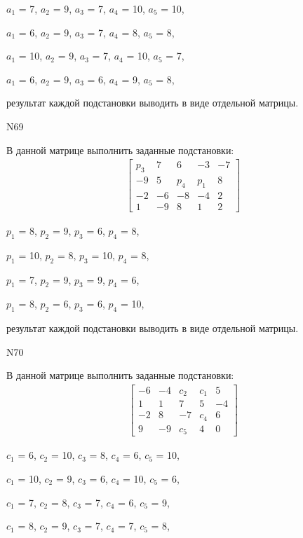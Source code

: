 \documentclass[11pt]{report}
\begin{document}
$a_{1}$ = 7, $a_{2}$ = 9, $a_{3}$ = 7, $a_{4}$ = 10, $a_{5}$ = 10, 

$a_{1}$ = 6, $a_{2}$ = 9, $a_{3}$ = 7, $a_{4}$ = 8, $a_{5}$ = 8, 

$a_{1}$ = 10, $a_{2}$ = 9, $a_{3}$ = 7, $a_{4}$ = 10, $a_{5}$ = 7, 

$a_{1}$ = 6, $a_{2}$ = 9, $a_{3}$ = 6, $a_{4}$ = 9, $a_{5}$ = 8, 

результат каждой подстановки выводить в виде отдельной матрицы.

N69

В данной матрице выполнить заданные подстановки:
\begin{align*}
\left[\begin{matrix}p_{3} & 7 & 6 & -3 & -7\\-9 & 5 & p_{4} & p_{1} & 8\\-2 & -6 & -8 & -4 & 2\\1 & -9 & 8 & 1 & 2\end{matrix}\right]
\end{align*}


$p_{1}$ = 8, $p_{2}$ = 9, $p_{3}$ = 6, $p_{4}$ = 8, 

$p_{1}$ = 10, $p_{2}$ = 8, $p_{3}$ = 10, $p_{4}$ = 8, 

$p_{1}$ = 7, $p_{2}$ = 9, $p_{3}$ = 9, $p_{4}$ = 6, 

$p_{1}$ = 8, $p_{2}$ = 6, $p_{3}$ = 6, $p_{4}$ = 10, 

результат каждой подстановки выводить в виде отдельной матрицы.

N70

В данной матрице выполнить заданные подстановки:
\begin{align*}
\left[\begin{matrix}-6 & -4 & c_{2} & c_{1} & 5\\1 & 1 & 7 & 5 & -4\\-2 & 8 & -7 & c_{4} & 6\\9 & -9 & c_{5} & 4 & 0\end{matrix}\right]
\end{align*}


$c_{1}$ = 6, $c_{2}$ = 10, $c_{3}$ = 8, $c_{4}$ = 6, $c_{5}$ = 10, 

$c_{1}$ = 10, $c_{2}$ = 9, $c_{3}$ = 6, $c_{4}$ = 10, $c_{5}$ = 6, 

$c_{1}$ = 7, $c_{2}$ = 8, $c_{3}$ = 7, $c_{4}$ = 6, $c_{5}$ = 9, 

$c_{1}$ = 8, $c_{2}$ = 9, $c_{3}$ = 7, $c_{4}$ = 7, $c_{5}$ = 8, 
\end{document}
